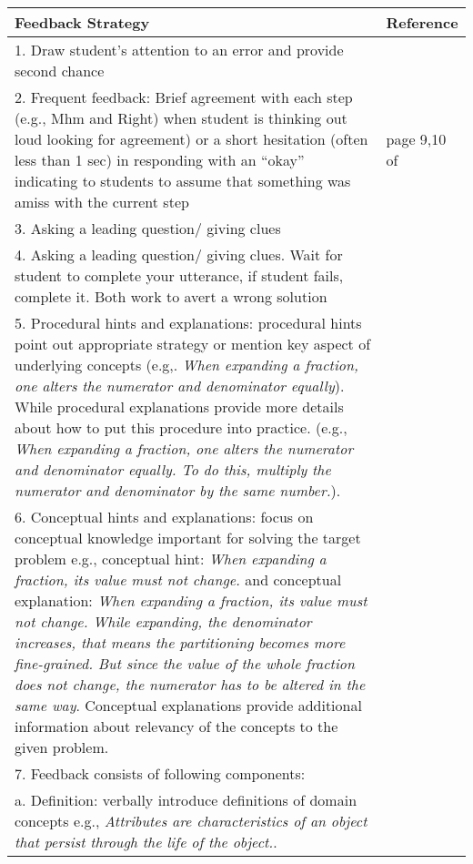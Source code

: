 \begin{longtable}{ | m{30em} | m{2cm}|  } 
\hline
\textbf{Feedback Strategy} & \textbf{Reference}  \\ 
\hline
1. Draw student’s attention to an error and provide second chance & \parencite{lepper1990self}  \\ 
\hline
2. Frequent feedback: Brief agreement with each step (e.g., Mhm and Right) when student is thinking out loud looking for agreement) or a short hesitation (often less than 1 sec) in responding with an “okay” indicating to students to assume that something was amiss with the current step & page 9,10 of \parencite{fox1991cognitive}  \\ 
\hline
3. Asking a leading question/ giving clues & \parencite{fox1991cognitive}\\
\hline
4. Asking a leading question/ giving clues.  Wait for student to complete your utterance, if student fails, complete it. Both work to avert a wrong solution & \parencite{lepper1990self}\\
\hline
5. Procedural hints and explanations: procedural hints point out appropriate strategy or mention key aspect of underlying concepts (e.g,. \emph{When expanding a fraction, one alters the numerator and denominator equally}). While procedural explanations provide more details about how to put this procedure into practice. (e.g., \emph{When expanding a fraction, one alters the numerator and denominator equally. To do this, multiply the numerator and denominator by the same number.}). & \parencite{narciss2014exploring}\\
\hline
6. Conceptual hints and explanations: focus on conceptual knowledge important for solving the target problem e.g., conceptual hint: \emph{When expanding a fraction, its value must not change.} and conceptual explanation: \emph{When expanding a fraction, its value must not change. While expanding, the denominator increases, that means the partitioning becomes more fine-grained. But since the value of the whole fraction does not change, the numerator has to be altered in the same way}. Conceptual explanations provide additional information about relevancy of the concepts to the given problem. & \parencite{narciss2014exploring} \\
\hline
7. Feedback consists of following components: & \parencite{parvez2008individualizing}\\
a. Definition: verbally introduce definitions of domain concepts e.g., \emph{Attributes are characteristics of an object that persist through the life of the object.}. & \\

\end{longtable}
